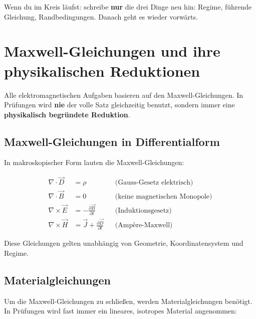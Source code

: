 \documentclass[a4paper]{article}
\newcommand{\imp}[1]{{\color{accent}\bfseries #1}}
\newcommand{\E}{\vec E}
\newcommand{\D}{\vec D}
\newcommand{\Hf}{\vec H}
\newcommand{\B}{\vec B}
\newcommand{\J}{\vec J}
\begin{document}
\begin{taktik}
Wenn du im Kreis läufst: schreibe \imp{nur} die drei Dinge neu hin:
Regime, führende Gleichung, Randbedingungen. Danach geht es wieder vorwärts.
\end{taktik}

\section{Maxwell-Gleichungen und ihre physikalischen Reduktionen}

\begin{merke}
Alle elektromagnetischen Aufgaben basieren auf den Maxwell-Gleichungen.
In Prüfungen wird \imp{nie} der volle Satz gleichzeitig benutzt, sondern immer eine
\imp{physikalisch begründete Reduktion}.
\end{merke}

\subsection{Maxwell-Gleichungen in Differentialform}

In makroskopischer Form lauten die Maxwell-Gleichungen:

\begin{align}
\nabla \cdot \D &= \rho
&&\text{(Gauss-Gesetz elektrisch)} \label{eq:maxwell1} \\
\nabla \cdot \B &= 0
&&\text{(keine magnetischen Monopole)} \label{eq:maxwell2} \\
\nabla \times \E &= -\frac{\partial \B}{\partial t}
&&\text{(Induktionsgesetz)} \label{eq:maxwell3} \\
\nabla \times \Hf &= \J + \frac{\partial \D}{\partial t}
&&\text{(Amp\`ere-Maxwell)} \label{eq:maxwell4}
\end{align}

Diese Gleichungen gelten unabhängig von Geometrie, Koordinatensystem und Regime.

\subsection{Materialgleichungen}

Um die Maxwell-Gleichungen zu schließen, werden Materialgleichungen benötigt.
In Prüfungen wird fast immer ein lineares, isotropes Material angenommen:
\end{document}
